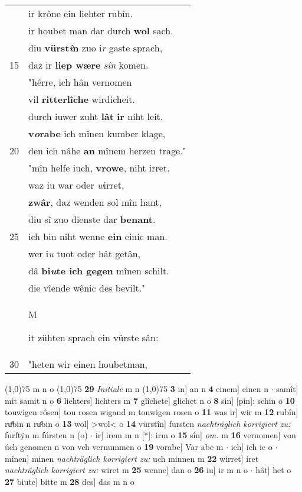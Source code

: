 \documentclass[8pt,a4paper,notitlepage]{article}
\begin{document}
\begin{table}[ht]
\begin{minipage}[t]{0.5\linewidth}
\begin{tabular}{rl}
 & ir krône ein liehter rubîn.\\ 
 & ir houbet man dar durch \textbf{wol} sach.\\ 
 & diu \textbf{vürst\textit{î}n} zuo i\textit{r} gaste sprach,\\ 
15 & daz ir \textbf{liep wære} \textit{sîn} komen.\\ 
 & "hêrre, ich hân vernomen\\ 
 & vil \textbf{ritterlîche} wirdicheit.\\ 
 & durch iuwer zuht \textbf{lât} \textbf{ir} niht leit.\\ 
 & \textbf{v\textit{o}rabe} ich mînen kumber klage,\\ 
20 & den ich nâhe \textbf{an} mînem herzen trage."\\ 
 & "mîn helfe iuch, \textbf{vrowe}, niht irret.\\ 
 & waz iu war oder \textit{w}irret,\\ 
 & \textbf{zwâr}, daz wenden sol mîn hant,\\ 
 & diu sî zuo dienste dar \textbf{benant}.\\ 
25 & ich bin niht wenne \textbf{ein} einic man.\\ 
 & wer i\textit{u} tuot oder hât getân,\\ 
 & dâ \textbf{bi\textit{u}te ich gegen} mînen schilt.\\ 
 & die vîende wênic des bevilt."\\ 
 & \begin{large}M\end{large}it zühten sprach ein vürste sân:\\ 
30 & "heten wir einen houbetman,\\ 
\end{tabular}
\scriptsize
\line(1,0){75} \newline
m n o \newline
\line(1,0){75} \newline
\textbf{29} \textit{Initiale} m n  \newline
\line(1,0){75} \newline
\textbf{3} in] an n \textbf{4} einem] einen n  $\cdot$ samît] mit samit n o \textbf{6} liehters] lichters m \textbf{7} glîchete] glichet n o \textbf{8} sin] [pin]: schin o \textbf{10} touwigen rôsen] tou rosen wigand m tonwigen rosen o \textbf{11} was ir] wir m \textbf{12} rubîn] ruͦbin n ruͯbin o \textbf{13} wol] >wol< o \textbf{14} vürstîn] fursten \textit{nachträglich korrigiert zu:} furſtÿn m fúrsten n (o)  $\cdot$ ir] irem m n [*]: irm o \textbf{15} sîn] \textit{om.} m \textbf{16} vernomen] von úch genomen n von vch vernummen o \textbf{19} vorabe] Var abe m  $\cdot$ ich] ich ie o  $\cdot$ mînen] minen \textit{nachträglich korrigiert zu:} uch minnen m \textbf{22} wirret] iret \textit{nachträglich korrigiert zu:} wiret m \textbf{25} wenne] dan o \textbf{26} iu] ir m n o  $\cdot$ hât] het o \textbf{27} biute] bitte m \textbf{28} des] das m n o \newline
\end{minipage}
\end{table}
\end{document}
